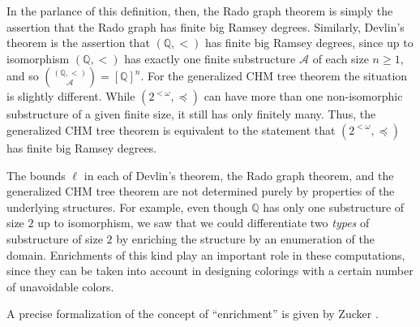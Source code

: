 \noindent In the parlance of this definition, then, the Rado graph theorem is simply the assertion that the Rado graph has finite big Ramsey degrees. Similarly, Devlin's theorem is the assertion that $(\mathbb{Q},<)$ has finite big Ramsey degrees, since up to isomorphism $(\mathbb{Q},<)$ has exactly one finite substructure $\mathcal{A}$ of each size $n \geq 1$, and so ${(\mathbb{Q},<) \choose \mathcal{A}} = [\mathbb{Q}]^n$. For the generalized CHM tree theorem the situation is slightly different. While $(2^{<\omega},\preceq)$ can have more than one non-isomorphic substructure of a given finite size, it still has only finitely many. Thus, the generalized CHM tree theorem is equivalent to the statement that $(2^{<\omega},\preceq)$ has finite big Ramsey degrees.

The bounds $\ell$ in each of Devlin's theorem, the Rado graph theorem, and the generalized CHM tree theorem are not determined purely by properties of the underlying structures. For example, even though $\mathbb{Q}$ has only one substructure of size $2$ up to isomorphism, we saw that we could differentiate two \emph{types} of substructure of size $2$ by enriching the structure by an enumeration of the domain. Enrichments of this kind play an important role in these computations, since they can be taken into account in designing colorings with a certain number of unavoidable colors.

A precise formalization of the concept of ``enrichment'' is given by Zucker \cite{Zucker-2019}.

